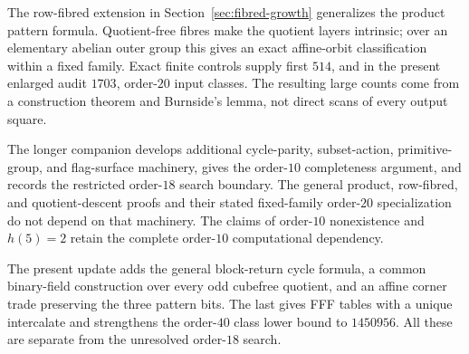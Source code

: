 The row-fibred extension in Section~\ref{sec:fibred-growth} generalizes
the product pattern formula. Quotient-free fibres make the quotient layers
intrinsic; over an elementary abelian outer group this gives an exact
affine-orbit classification within a fixed family. Exact finite controls
supply first $514$, and in the present enlarged audit $1703$,
order-$20$ input classes. The resulting large counts
come from a construction theorem and Burnside's lemma, not direct scans
of every output square.

The longer companion develops additional cycle-parity, subset-action,
primitive-group, and flag-surface machinery, gives the order-$10$
completeness argument, and records the restricted order-$18$ search
boundary. The general product, row-fibred, and quotient-descent
proofs and their stated fixed-family order-$20$ specialization do not depend
on that machinery. The claims of order-$10$ nonexistence and $h(5)=2$
retain the complete order-$10$ computational dependency.

The present update adds the general block-return cycle formula, a common
binary-field construction over every odd cubefree quotient, and an affine
corner trade preserving the three pattern bits. The last gives FFF tables
with a unique intercalate and strengthens the order-$40$ class lower bound
to $1450956$. All these are separate from the unresolved order-$18$ search.
